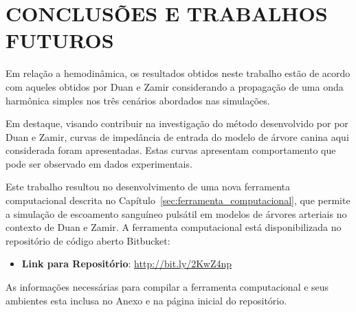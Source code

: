 \chapter{CONCLUSÕES E TRABALHOS FUTUROS}\label{sec:conclusoes}


Em relação a hemodinâmica, os resultados obtidos neste trabalho estão de acordo com aqueles obtidos por Duan e Zamir\textcolor{blue}{ \cite{Duan1992} } considerando a propagação de uma onda harmônica simples nos três cenários abordados nas simulações. 

Em destaque, visando contribuir na investigação do método desenvolvido por por Duan e Zamir, curvas de impedância de entrada do modelo de árvore canina aqui considerada foram apresentadas. Estas curvas apresentam comportamento que pode ser observado em dados experimentais.

Este trabalho resultou no desenvolvimento de uma nova ferramenta computacional descrita no Capítulo~\ref{sec:ferramenta_computacional}, que permite a simulação de escoamento sanguíneo pulsátil em modelos de árvores arteriais no contexto de Duan e Zamir. A ferramenta computacional está disponibilizada no repositório de código aberto Bitbucket:

\begin{itemize}
	\item \textbf{Link para Repositório}: \href{http://bit.ly/2KwZ4np}{http://bit.ly/2KwZ4np}
\end{itemize}

As informações necessárias para compilar a ferramenta computacional e seus ambientes esta inclusa no Anexo e na página inicial do repositório.



